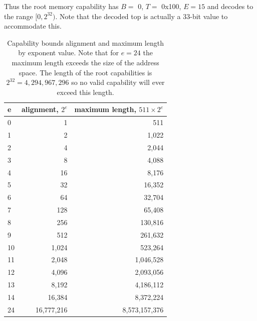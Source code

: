 Thus the root memory capability has $B =$ 0, $T =$ 0x100, $E = 15$ and decodes to the range $[0,2^{32})$.
Note that the decoded top is actually a 33-bit value to accommodate this.

\begin{table}
  \centering
  \begin{tabular}{lrr}
  \toprule
  e  &  alignment, $2^e$ &  maximum length, $511 \times 2^e$ \\
  \midrule
  0  &          1 &         511 \\
  1  &          2 &        1,022 \\
  2  &          4 &        2,044 \\
  3  &          8 &        4,088 \\
  4  &         16 &        8,176 \\
  5  &         32 &       16,352 \\
  6  &         64 &       32,704 \\
  7  &        128 &       65,408 \\
  8  &        256 &      130,816 \\
  9  &        512 &      261,632 \\
  10 &       1,024 &      523,264 \\
  11 &       2,048 &     1,046,528 \\
  12 &       4,096 &     2,093,056 \\
  13 &       8,192 &     4,186,112 \\
  14 &      16,384 &     8,372,224 \\
  24 &   16,777,216 &  8,573,157,376 \\
  \bottomrule
  \end{tabular}
  \caption{\label{tab:caplen}
  Capability bounds alignment and maximum length by exponent value.
  Note that for $e=24$ the maximum length exceeds the size of the address space.
  The length of the root capabilities is $2^{32} = 4,294,967,296$ so no valid capability will ever exceed this length.
  }
\end{table}

